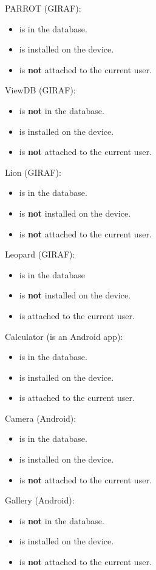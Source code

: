 PARROT (GIRAF):
\begin{itemize}
\item is in the database.
\item is installed on the device.
\item is \textbf{not} attached to the current user.
\end{itemize}

ViewDB (GIRAF):
\begin{itemize}
\item is \textbf{not} in the database.
\item is installed on the device.
\item is \textbf{not} attached to the current user.
\end{itemize}

Lion (GIRAF):
\begin{itemize}
\item is in the database.
\item is \textbf{not} installed on the device.
\item is \textbf{not} attached to the current user.
\end{itemize}

Leopard (GIRAF):
\begin{itemize}
\item is in the database
\item is \textbf{not} installed on the device.
\item is attached to the current user.
\end{itemize}

Calculator (is an Android app):
\begin{itemize}
\item is in the database.
\item is installed on the device.
\item is attached to the current user.
\end{itemize}

Camera (Android):
\begin{itemize}
\item is in the database.
\item is installed on the device.
\item is \textbf{not} attached to the current user.
\end{itemize}

Gallery (Android):
\begin{itemize}
\item is \textbf{not} in the database.
\item is installed on the device.
\item is \textbf{not} attached to the current user.
\end{itemize}

